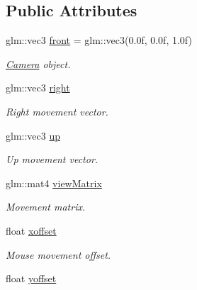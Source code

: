 \subsection*{Public Attributes}
\begin{DoxyCompactItemize}
\item 
glm\+::vec3 \hyperlink{class_camera_component_a3cc09f3e499de24e429ad2ad30b6ff43}{front} = glm\+::vec3(0.\+0f, 0.\+0f, 1.\+0f)
\begin{DoxyCompactList}\small\item\em \hyperlink{class_camera}{Camera} object. \end{DoxyCompactList}\item 
\hypertarget{class_camera_component_a62040ca115beaa48627fe56d330647c0}{glm\+::vec3 \hyperlink{class_camera_component_a62040ca115beaa48627fe56d330647c0}{right}}\label{class_camera_component_a62040ca115beaa48627fe56d330647c0}

\begin{DoxyCompactList}\small\item\em Right movement vector. \end{DoxyCompactList}\item 
\hypertarget{class_camera_component_a639f14e0057198d84ed8de71c3df3303}{glm\+::vec3 \hyperlink{class_camera_component_a639f14e0057198d84ed8de71c3df3303}{up}}\label{class_camera_component_a639f14e0057198d84ed8de71c3df3303}

\begin{DoxyCompactList}\small\item\em Up movement vector. \end{DoxyCompactList}\item 
\hypertarget{class_camera_component_aa9ba12dfc1a9b7b06bf79fdb0a91a3e2}{glm\+::mat4 \hyperlink{class_camera_component_aa9ba12dfc1a9b7b06bf79fdb0a91a3e2}{view\+Matrix}}\label{class_camera_component_aa9ba12dfc1a9b7b06bf79fdb0a91a3e2}

\begin{DoxyCompactList}\small\item\em Movement matrix. \end{DoxyCompactList}\item 
\hypertarget{class_camera_component_a385f35e4c5d616580e0bd4ded5c4653f}{float \hyperlink{class_camera_component_a385f35e4c5d616580e0bd4ded5c4653f}{xoffset}}\label{class_camera_component_a385f35e4c5d616580e0bd4ded5c4653f}

\begin{DoxyCompactList}\small\item\em Mouse movement offset. \end{DoxyCompactList}\item 
\hypertarget{class_camera_component_aac7aad40b74b70920b8b5d214550fe91}{float \hyperlink{class_camera_component_aac7aad40b74b70920b8b5d214550fe91}{yoffset}}\label{class_camera_component_aac7aad40b74b70920b8b5d214550fe91}


\end{DoxyCompactItemize}
